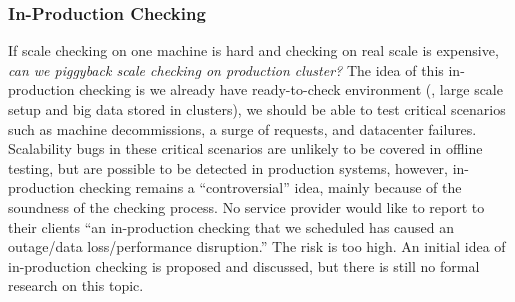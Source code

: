 \subsubsection{In-Production Checking}

If scale checking on one machine is hard and checking on real scale is
expensive, \textit{can we piggyback scale checking on production cluster?} The
idea of this in-production checking is we already have ready-to-check
environment (\ie, large scale setup and big data stored in clusters), we should
be able to test critical scenarios such as machine decommissions, a surge of
requests, and datacenter failures. Scalability bugs in these critical scenarios
are unlikely to be covered in offline testing, but are possible to be detected
in production systems, however, in-production checking remains a
``controversial'' idea, mainly because of the soundness of the checking process.
No service provider would like to report to their clients ``an in-production
checking that we scheduled has caused an outage/data loss/performance
disruption.'' The risk is too high. An initial idea of in-production
checking is proposed \cite{Leesatapornwongsa+14-Drill} and discussed, but there
is still no formal research on this topic.

